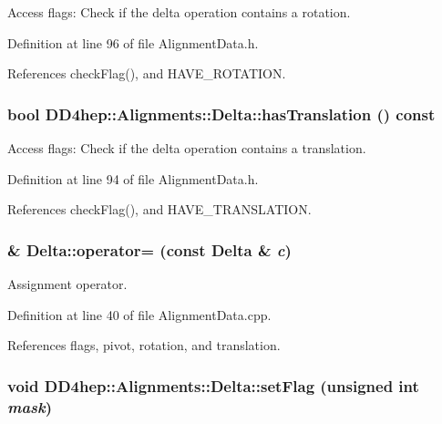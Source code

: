 Access flags: Check if the delta operation contains a rotation. 

Definition at line 96 of file AlignmentData.h.

References checkFlag(), and HAVE\_\-ROTATION.\hypertarget{class_d_d4hep_1_1_alignments_1_1_delta_a8f3a0954d20782c7fa2c3aec4553dafa}{
\subsubsection[{hasTranslation}]{\setlength{\rightskip}{0pt plus 5cm}bool DD4hep::Alignments::Delta::hasTranslation () const}}
\label{class_d_d4hep_1_1_alignments_1_1_delta_a8f3a0954d20782c7fa2c3aec4553dafa}


Access flags: Check if the delta operation contains a translation. 

Definition at line 94 of file AlignmentData.h.

References checkFlag(), and HAVE\_\-TRANSLATION.\hypertarget{class_d_d4hep_1_1_alignments_1_1_delta_afb22b2e26ceb2bb74b5fae0f2415abdd}{
\subsubsection[{operator=}]{ \& Delta::operator= (const {\bf Delta} \& {\em c})}}
\label{class_d_d4hep_1_1_alignments_1_1_delta_afb22b2e26ceb2bb74b5fae0f2415abdd}


Assignment operator. 

Definition at line 40 of file AlignmentData.cpp.

References flags, pivot, rotation, and translation.\hypertarget{class_d_d4hep_1_1_alignments_1_1_delta_a395852746451e6e2de16e829161a5ac3}{
\subsubsection[{setFlag}]{\setlength{\rightskip}{0pt plus 5cm}void DD4hep::Alignments::Delta::setFlag (unsigned int {\em mask})}}
\label{class_d_d4hep_1_1_alignments_1_1_delta_a395852746451e6e2de16e829161a5ac3}


